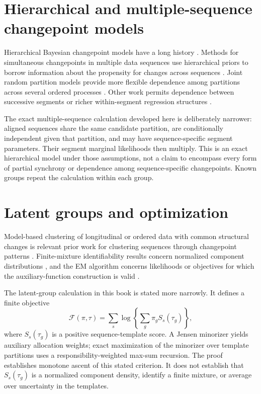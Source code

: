 \section{Hierarchical and multiple-sequence changepoint models}
Hierarchical Bayesian changepoint models have a long history
\citep{carlin1992hierBayesCP}. Methods for simultaneous changepoints in multiple data sequences use
hierarchical priors to borrow information about the propensity for changes across sequences
\citep{fan2017basic}. Joint random partition models provide more flexible dependence among
partitions across several ordered processes \citep{quinlan2024jrpm}. Other work permits dependence
between successive segments or richer within-segment regression structures
\citep{fearnhead2011dependence,ruggieri2014bcpvs}.

The exact multiple-sequence calculation developed here is deliberately narrower: aligned sequences
share the same candidate partition, are conditionally independent given that partition, and may
have sequence-specific segment parameters. Their segment marginal likelihoods then multiply. This
is an exact hierarchical model under those assumptions, not a claim to encompass every form of
partial synchrony or dependence among sequence-specific changepoints. Known groups repeat the
calculation within each group.

\section{Latent groups and optimization}
Model-based clustering of longitudinal or ordered data with common structural changes is relevant
prior work for clustering sequences through changepoint patterns
\citep{corradin2026commonstructural}. Finite-mixture identifiability results concern normalized
component distributions \citep{teicher1963identifiability}, and the EM algorithm concerns
likelihoods or objectives for which the auxiliary-function construction is valid
\citep{dempster1977em}.

The latent-group calculation in this book is stated more narrowly. It defines a finite objective
\[
\mathcal F(\pi,\tau)=\sum_s\log\!\left\{\sum_g\pi_gS_s(\tau_g)\right\},
\]
where $S_s(\tau_g)$ is a positive sequence-template score. A Jensen minorizer yields auxiliary
allocation weights; exact maximization of the minorizer over template partitions uses a
responsibility-weighted max-sum recursion. The proof establishes monotone ascent of this stated
criterion. It does not establish that $S_s(\tau_g)$ is a normalized component density, identify a
finite mixture, or average over uncertainty in the templates.

